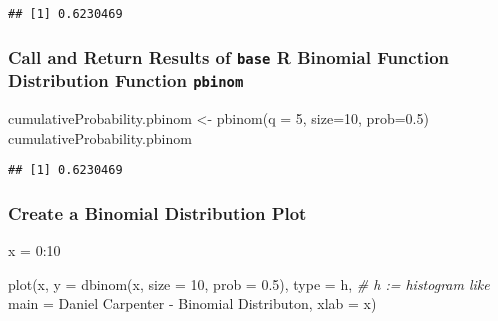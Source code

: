 \documentclass[
  12pt,
]{article}
\newenvironment{Shaded}{\begin{snugshade}}{\end{snugshade}}
\newcommand{\AttributeTok}[1]{\textcolor[rgb]{0.77,0.63,0.00}{#1}}
\newcommand{\CommentTok}[1]{\textcolor[rgb]{0.56,0.35,0.01}{\textit{#1}}}
\newcommand{\DecValTok}[1]{\textcolor[rgb]{0.00,0.00,0.81}{#1}}
\newcommand{\FloatTok}[1]{\textcolor[rgb]{0.00,0.00,0.81}{#1}}
\newcommand{\FunctionTok}[1]{\textcolor[rgb]{0.00,0.00,0.00}{#1}}
\newcommand{\NormalTok}[1]{#1}
\newcommand{\OtherTok}[1]{\textcolor[rgb]{0.56,0.35,0.01}{#1}}
\newcommand{\SpecialCharTok}[1]{\textcolor[rgb]{0.00,0.00,0.00}{#1}}
\newcommand{\StringTok}[1]{\textcolor[rgb]{0.31,0.60,0.02}{#1}}
\begin{document}
\begin{verbatim}
## [1] 0.6230469
\end{verbatim}

\hypertarget{call-and-return-results-of-base-r-binomial-function-distribution-function-pbinom}{%
\subsubsection{\texorpdfstring{Call and Return Results of \texttt{base}
R Binomial Function Distribution Function
\texttt{pbinom}}{Call and Return Results of base R Binomial Function Distribution Function pbinom}}\label{call-and-return-results-of-base-r-binomial-function-distribution-function-pbinom}}

\begin{Shaded}
\begin{Highlighting}[]
\NormalTok{cumulativeProbability.pbinom }\OtherTok{\textless{}{-}} \FunctionTok{pbinom}\NormalTok{(}\AttributeTok{q =} \DecValTok{5}\NormalTok{, }\AttributeTok{size=}\DecValTok{10}\NormalTok{, }\AttributeTok{prob=}\FloatTok{0.5}\NormalTok{)}
\NormalTok{cumulativeProbability.pbinom}
\end{Highlighting}
\end{Shaded}

\begin{verbatim}
## [1] 0.6230469
\end{verbatim}

\hypertarget{create-a-binomial-distribution-plot}{%
\subsubsection{Create a Binomial Distribution
Plot}\label{create-a-binomial-distribution-plot}}

\begin{Shaded}
\begin{Highlighting}[]
\NormalTok{x }\OtherTok{=} \DecValTok{0}\SpecialCharTok{:}\DecValTok{10}

\FunctionTok{plot}\NormalTok{(x, }
     \AttributeTok{y =} \FunctionTok{dbinom}\NormalTok{(x, }\AttributeTok{size =} \DecValTok{10}\NormalTok{, }\AttributeTok{prob =} \FloatTok{0.5}\NormalTok{),}
     \AttributeTok{type =} \StringTok{\textquotesingle{}h\textquotesingle{}}\NormalTok{, }\CommentTok{\# h := histogram like}
     \AttributeTok{main =} \StringTok{\textquotesingle{}Daniel Carpenter {-} Binomial Distributon\textquotesingle{}}\NormalTok{,}
     \AttributeTok{xlab =} \StringTok{\textquotesingle{}x\textquotesingle{}}\NormalTok{)}
\end{Highlighting}
\end{Shaded}
\end{document}
